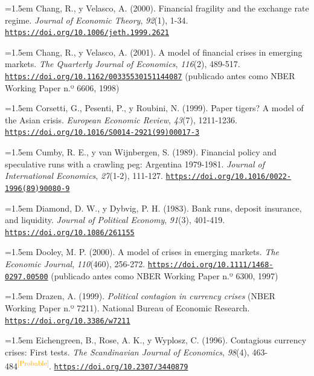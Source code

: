 \documentclass[10pt,a4paper]{article}
\begin{document}
\noindent\hangindent=1.5em Chang, R., y Velasco, A. (2000). Financial fragility and the exchange rate regime. \textit{Journal of Economic Theory}, \textit{92}(1), 1-34. \href{https://doi.org/10.1006/jeth.1999.2621}{\nolinkurl{https://doi.org/10.1006/jeth.1999.2621}}

\noindent\hangindent=1.5em Chang, R., y Velasco, A. (2001). A model of financial crises in emerging markets. \textit{The Quarterly Journal of Economics}, \textit{116}(2), 489-517. \href{https://doi.org/10.1162/00335530151144087}{\nolinkurl{https://doi.org/10.1162/00335530151144087}} (publicado antes como NBER Working Paper n.º 6606, 1998)

\noindent\hangindent=1.5em Corsetti, G., Pesenti, P., y Roubini, N. (1999). Paper tigers? A model of the Asian crisis. \textit{European Economic Review}, \textit{43}(7), 1211-1236. \href{https://doi.org/10.1016/S0014-2921(99)00017-3}{\nolinkurl{https://doi.org/10.1016/S0014-2921(99)00017-3}}

\noindent\hangindent=1.5em Cumby, R. E., y van Wijnbergen, S. (1989). Financial policy and speculative runs with a crawling peg: Argentina 1979-1981. \textit{Journal of International Economics}, \textit{27}(1-2), 111-127. \href{https://doi.org/10.1016/0022-1996(89)90080-9}{\nolinkurl{https://doi.org/10.1016/0022-1996(89)90080-9}}

\noindent\hangindent=1.5em Diamond, D. W., y Dybvig, P. H. (1983). Bank runs, deposit insurance, and liquidity. \textit{Journal of Political Economy}, \textit{91}(3), 401-419. \href{https://doi.org/10.1086/261155}{\nolinkurl{https://doi.org/10.1086/261155}}

\noindent\hangindent=1.5em Dooley, M. P. (2000). A model of crises in emerging markets. \textit{The Economic Journal}, \textit{110}(460), 256-272. \href{https://doi.org/10.1111/1468-0297.00500}{\nolinkurl{https://doi.org/10.1111/1468-0297.00500}} (publicado antes como NBER Working Paper n.º 6300, 1997)

\noindent\hangindent=1.5em Drazen, A. (1999). \textit{Political contagion in currency crises} (NBER Working Paper n.º 7211). National Bureau of Economic Research. \href{https://doi.org/10.3386/w7211}{\nolinkurl{https://doi.org/10.3386/w7211}}

\noindent\hangindent=1.5em Eichengreen, B., Rose, A. K., y Wyplosz, C. (1996). Contagious currency crises: First tests. \textit{The Scandinavian Journal of Economics}, \textit{98}(4), 463-484\textcolor{orange}{\textsuperscript{[Probable]}}. \href{https://doi.org/10.2307/3440879}{\nolinkurl{https://doi.org/10.2307/3440879}}
\end{document}
